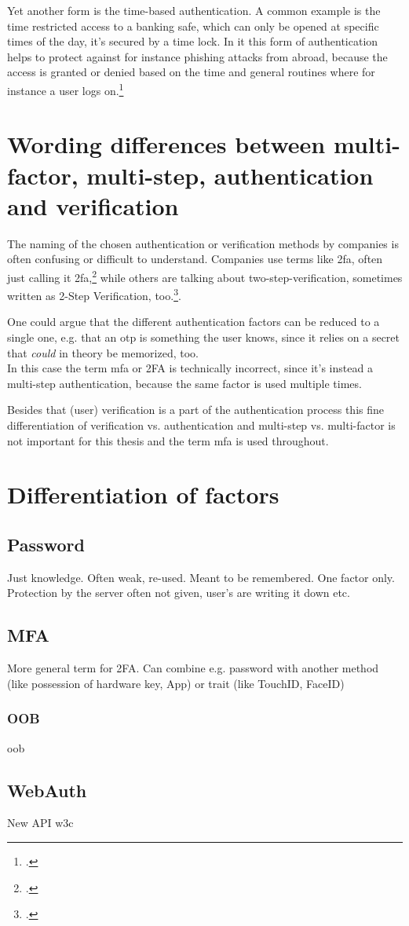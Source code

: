 Yet another form is the time-based authentication. A common example is the time restricted access to a banking safe, which can only be opened at specific times of the day, it's secured by a time lock. In \gls{it} this form of authentication helps to protect against for instance phishing attacks from abroad, because the access is granted or denied based on the time and general routines where for instance a user logs on.\footcite[See][191]{dasgupta2017multi}

\section{Wording differences between multi-factor, multi-step, authentication and verification}

The naming of the chosen authentication or verification methods by companies is often confusing or difficult to understand. Companies use terms like \gls{2fa}, often just calling it \gls{2fa},\footcite{apple_2fa} while others are talking about two-step-verification, sometimes written as 2-Step Verification, too.\footcites[][]{apple_s2v}[][]{playstation}[][]{google_2-step_verification}[][]{microsoft_2sv}.

One could argue that the different authentication factors can be reduced to a single one, e.g. that an \gls{otp} is \frqq something the user knows\flqq{}, since it relies on a secret that \textit{could} in theory be memorized, too.\\
In this case the term \gls{mfa} or 2FA is technically incorrect, since it's instead a multi-step authentication, because the same factor is used multiple times.

Besides that (user) verification is a part of the authentication process this fine differentiation of verification vs. authentication and multi-step vs. multi-factor is not important for this thesis and the term \gls{mfa} is used throughout.

\newpage

\section{Differentiation of factors}

\subsection{Password}

Just knowledge. Often weak, re-used. Meant to be remembered. One factor only.\\
Protection by the server often not given, user's are writing it down etc.

\subsection{MFA}

More general term for 2FA. Can combine e.g. password with another method (like possession of hardware key, App) or trait (like TouchID, FaceID)

\subsubsection{OOB}

\gls{oob}

\subsection{WebAuth}

New API \gls{w3c}